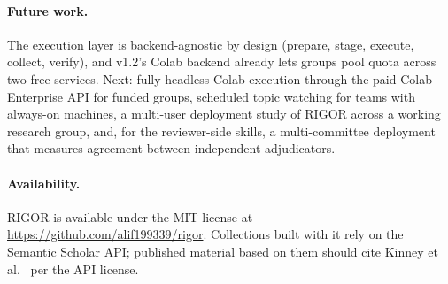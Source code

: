\documentclass[11pt]{article}
\begin{document}
\paragraph{Future work.} The execution layer is backend-agnostic by design
(prepare, stage, execute, collect, verify), and v1.2's Colab backend already
lets groups pool quota across two free services. Next: fully headless Colab
execution through the paid Colab Enterprise API for funded groups, scheduled
topic watching for teams with always-on machines, a multi-user
deployment study of RIGOR across a working research group, and, for the
reviewer-side skills, a multi-committee deployment that measures agreement
between independent adjudicators.

\paragraph{Availability.} RIGOR is available under the MIT license at
\url{https://github.com/alif199339/rigor}. Collections built with it
rely on the Semantic Scholar API; published material based on them should cite
Kinney et al.~\cite{kinney2023semanticscholar} per the API license.



\end{document}
